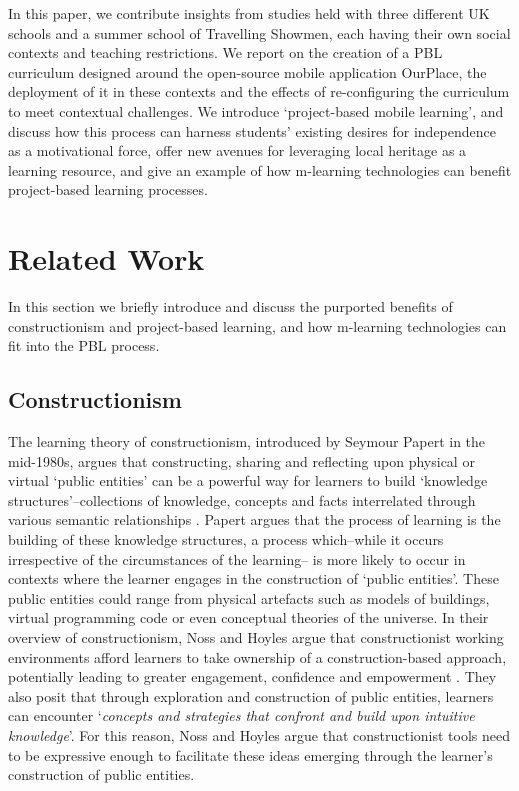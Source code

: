 \documentclass[,hyphens]{sigchi}
\begin{document}
In this paper, we contribute insights from studies held with three different UK schools and a summer school of Travelling Showmen, each having their own social contexts and teaching restrictions. We report on the creation of a PBL curriculum designed around the open-source mobile application OurPlace, the deployment of it in these contexts and the effects of re-configuring the curriculum to meet contextual challenges. We introduce `project-based mobile learning', and discuss how this process can harness students' existing desires for independence as a motivational force, offer new avenues for leveraging local heritage as a learning resource, and give an example of how m-learning technologies can benefit project-based learning processes.

\section{Related Work}
In this section we briefly introduce and discuss the purported benefits of constructionism and project-based learning, and how m-learning technologies can fit into the PBL process.

\subsection{Constructionism}
The learning theory of constructionism, introduced by Seymour Papert in the mid-1980s, argues that constructing, sharing and reflecting upon physical or virtual `public entities' can be a powerful way for learners to build `knowledge structures'--collections of knowledge, concepts and facts interrelated through various semantic relationships \cite{PapertSeymourandHarel1991a}. Papert argues that the process of learning is the building of these knowledge structures, a process which--while it occurs irrespective of the circumstances of the learning-- is more likely to occur in contexts where the learner engages in the construction of `public entities'. These public entities could range from physical artefacts such as models of buildings, virtual programming code or even conceptual theories of the universe. In their overview of constructionism, Noss and Hoyles argue that constructionist working environments afford learners to take ownership of a construction-based approach, potentially leading to greater engagement, confidence and empowerment \cite{Noss2017}. They also posit that through exploration and construction of public entities, learners can encounter `\textit{concepts and strategies that confront and build upon intuitive knowledge}'. For this reason, Noss and Hoyles argue that constructionist tools need to be expressive enough to facilitate these ideas emerging through the learner's construction of public entities.
\end{document}
